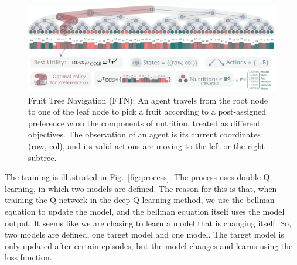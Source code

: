 \documentclass[11pt,onecolumn]{IEEEtran}
\begin{document}
\begin{figure}[!htb]
    \centering
    \includegraphics[width=1\linewidth]{tree.png}
    \caption{Fruit Tree Navigation (FTN): An agent travels from the root node to one of the leaf node to pick a fruit according to a post-assigned preference $w$ on the components of nutrition, treated as different objectives. The observation of an agent is its current coordinates (row, col), and its valid actions are moving to the left or the right subtree.}
    \label{fig:blstm}
\end{figure}

The training is illustrated in Fig.~\ref{fig:process}. The process uses double Q learning, in which two models are defined. The reason for this is that, when training the Q network in the deep Q learning method, we use the bellman equation to update the model, and the bellman equation itself uses the model output. It seems like we are chasing to learn a model that is changing itself. So, two models are defined, one target model and one model. The target model is only updated after certain episodes, but the model changes and learns using the loss function. 
\end{document}
